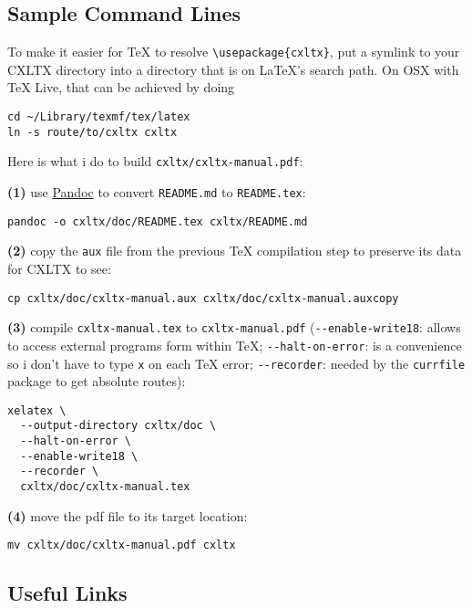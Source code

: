 \subsection{Sample Command Lines}\label{sample-command-lines}

To make it easier for TeX to resolve
\texttt{\textbackslash{}usepackage\{cxltx\}}, put a symlink to your
CXLTX directory into a directory that is on LaTeX's search path. On OSX
with TeX Live, that can be achieved by doing

\begin{verbatim}
cd ~/Library/texmf/tex/latex
ln -s route/to/cxltx cxltx
\end{verbatim}

Here is what i do to build \texttt{cxltx/cxltx-manual.pdf}:

\textbf{(1)} use \href{http://http://johnmacfarlane.net/pandoc}{Pandoc}
to convert \texttt{README.md} to \texttt{README.tex}:

\begin{verbatim}
pandoc -o cxltx/doc/README.tex cxltx/README.md
\end{verbatim}

\textbf{(2)} copy the \texttt{aux} file from the previous TeX
compilation step to preserve its data for CXLTX to see:

\begin{verbatim}
cp cxltx/doc/cxltx-manual.aux cxltx/doc/cxltx-manual.auxcopy
\end{verbatim}

\textbf{(3)} compile \texttt{cxltx-manual.tex} to
\texttt{cxltx-manual.pdf} (\texttt{-{}-enable-write18}: allows to access
external programs form within TeX; \texttt{-{}-halt-on-error}: is a
convenience so i don't have to type \texttt{x} on each TeX error;
\texttt{-{}-recorder}: needed by the \texttt{currfile} package to get
absolute routes):

\begin{verbatim}
xelatex \
  --output-directory cxltx/doc \
  --halt-on-error \
  --enable-write18 \
  --recorder \
  cxltx/doc/cxltx-manual.tex
\end{verbatim}

\textbf{(4)} move the pdf file to its target location:

\begin{verbatim}
mv cxltx/doc/cxltx-manual.pdf cxltx
\end{verbatim}

\subsection{Useful Links}\label{useful-links}


